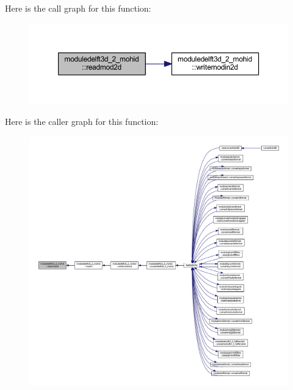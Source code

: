 Here is the call graph for this function\+:\nopagebreak
\begin{figure}[H]
\begin{center}
\leavevmode
\includegraphics[width=350pt]{namespacemoduledelft3d__2__mohid_a677f5946463bc1873841fd2e4a910617_cgraph}
\end{center}
\end{figure}
Here is the caller graph for this function\+:\nopagebreak
\begin{figure}[H]
\begin{center}
\leavevmode
\includegraphics[width=350pt]{namespacemoduledelft3d__2__mohid_a677f5946463bc1873841fd2e4a910617_icgraph}
\end{center}
\end{figure}
\mbox{\label{namespacemoduledelft3d__2__mohid_aab6512966524b2869edb990481150929}} 
